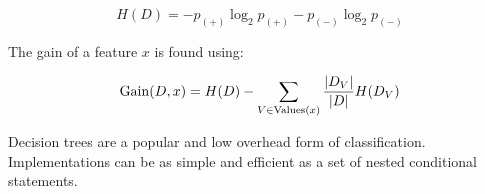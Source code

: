 \begin{equation}
  H(D) = - p_{(+)}\log_2p_{(+)} - p_{(-)}\log_2p_{(-)}
\end{equation}

The gain of a feature $x$ is found using:

\begin{equation}
  \operatorname*{Gain}(D, x) = H(D) - \sum_{V \in \text{Values}(x)}\frac{|D_V|}{|D|}H(D_V)
\end{equation}

Decision trees are a popular and low overhead form of classification. Implementations can be as simple and efficient as a set of nested conditional statements.









